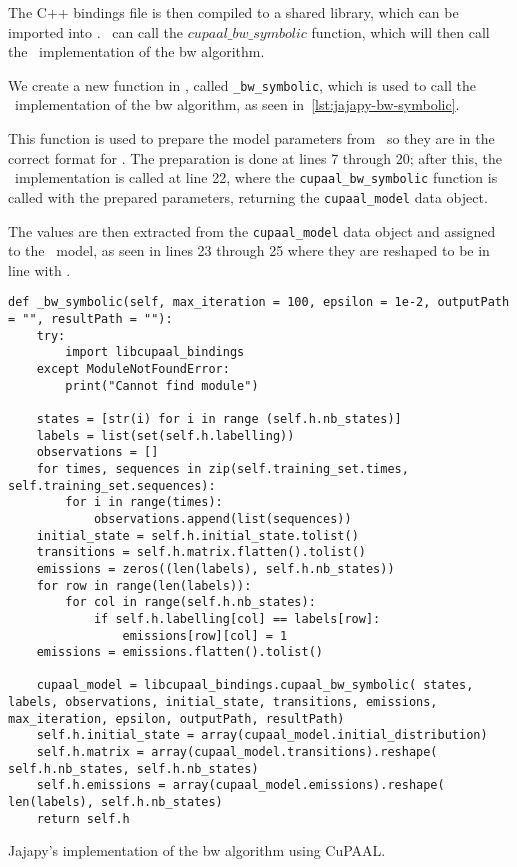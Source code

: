 The C++ bindings file is then compiled to a shared library, which can be imported into \Jajapy.
\Jajapy\ can call the $cupaal\_bw\_symbolic$ function, which will then call the \Cupaal\ implementation of the \gls{bw} algorithm.

We create a new function in \Jajapy, called \texttt{\_bw\_symbolic}, which is used to call the \Cupaal\ implementation of the \gls{bw} algorithm, as seen in~\autoref{lst:jajapy-bw-symbolic}.

This function is used to prepare the model parameters from \Jajapy\ so they are in the correct format for \Cupaal.
The preparation is done at lines 7 through 20; after this, the \Cupaal\ implementation is called at line 22, where the \texttt{cupaal\_bw\_symbolic} function is called with the prepared parameters, returning the \texttt{cupaal\_model} data object.

The values are then extracted from the \texttt{cupaal\_model} data object and assigned to the \Jajapy\ model, as seen in lines 23 through 25 where they are reshaped to be in line with \Jajapy.

\begin{listing*}
    \begin{verbatim}
def _bw_symbolic(self, max_iteration = 100, epsilon = 1e-2, outputPath = "", resultPath = ""):
    try:
        import libcupaal_bindings
    except ModuleNotFoundError:
        print("Cannot find module")

    states = [str(i) for i in range (self.h.nb_states)]
    labels = list(set(self.h.labelling))
    observations = []
    for times, sequences in zip(self.training_set.times, self.training_set.sequences):
        for i in range(times):
            observations.append(list(sequences))
    initial_state = self.h.initial_state.tolist()
    transitions = self.h.matrix.flatten().tolist()
    emissions = zeros((len(labels), self.h.nb_states))
    for row in range(len(labels)):
        for col in range(self.h.nb_states):
            if self.h.labelling[col] == labels[row]:
                emissions[row][col] = 1
    emissions = emissions.flatten().tolist()

    cupaal_model = libcupaal_bindings.cupaal_bw_symbolic( states, labels, observations, initial_state, transitions, emissions, max_iteration, epsilon, outputPath, resultPath)
    self.h.initial_state = array(cupaal_model.initial_distribution)
    self.h.matrix = array(cupaal_model.transitions).reshape( self.h.nb_states, self.h.nb_states)
    self.h.emissions = array(cupaal_model.emissions).reshape( len(labels), self.h.nb_states)
    return self.h
      \end{verbatim}
    \caption{Jajapy's implementation of the \gls{bw} algorithm using CuPAAL.}
    \label{lst:jajapy-bw-symbolic}
\end{listing*}


